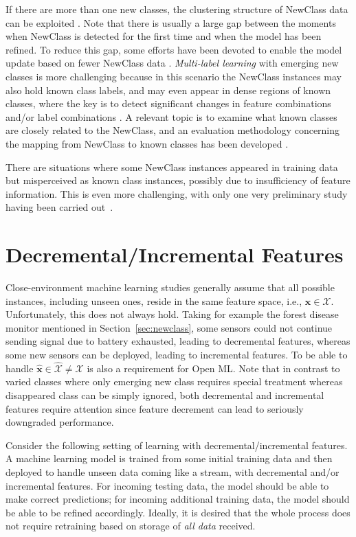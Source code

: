 \documentclass[review,11pt]{ReportTemplate}
\begin{document}
If there are more than one new classes, the clustering structure of NewClass data can be exploited \cite{Zhu:Ting:Zhou2017aaai}. Note that there is usually a large gap between the moments when NewClass is detected for the first time and when the model has been refined. To reduce this gap, some efforts have been devoted to enable the model update based on fewer NewClass data \cite{Zhu:Ting:Zhou2017}. \textit{Multi-label learning} with emerging new classes is more challenging because in this scenario the NewClass instances may also hold known class labels, and may even appear in dense regions of known classes, where the key is to detect significant changes in feature combinations and/or label combinations \cite{Zhu:Ting:Zhou2018}. A relevant topic is to examine what known classes are closely related to the NewClass, and an evaluation methodology concerning the mapping from NewClass to known classes has been developed \cite{Faria:Goncalves:Gama2015}.

There are situations where some NewClass instances appeared in training data but misperceived as known class instances, possibly due to insufficiency of feature information. This is even more challenging, with only one very preliminary study having been carried out~\cite{Zhao:Zhang:Zhou2021}.


\section{Decremental/Incremental Features}\label{sec:feature}

Close-environment machine learning studies generally assume that all possible instances, including unseen ones, reside in the same feature space, i.e., $\hat{\bm{x}} \in \mathcal{X}$. Unfortunately, this does not always hold. Taking for example the forest disease monitor mentioned in Section~\ref{sec:newclass}, some sensors could not continue sending signal due to battery exhausted, leading to decremental features, whereas some new sensors can be deployed, leading to incremental features. To be able to handle $\hat{\bm{x}} \in \hat{\mathcal{X}} \neq \mathcal{X}$ is also a requirement for Open ML. Note that in contrast to varied classes where only emerging new class requires special treatment whereas disappeared class can be simply ignored, both decremental and incremental features require attention since feature decrement can lead to seriously downgraded performance.

Consider the following setting of learning with decremental/incremental features. A machine learning model is trained from some initial training data and then deployed to handle unseen data coming like a stream, with decremental and/or incremental features. For incoming testing data, the model should be able to make correct predictions; for incoming additional training data, the model should be able to be refined accordingly. Ideally, it is desired that the whole process does not require retraining based on storage of \textit{all data} received.
\end{document}
